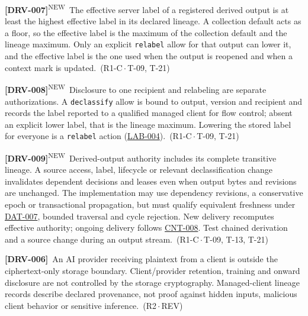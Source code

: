 \documentclass[11pt,a4paper]{article}
\newcommand{\code}[1]{{\small\nolinkurl{#1}}}
\newcommand{\rr}[1]{\hyperlink{req:#1}{#1}}
\newcommand{\reqtag}[2]{{\footnotesize\color{accent}(#1\,$\cdot$\,#2)}}
\newcommand{\req}[4]{\par\noindent\hypertarget{req:#1}{\textbf{[#1]}}\ #4\ \reqtag{#2}{#3}\par}
\newcommand{\reqn}[4]{\par\noindent\hypertarget{req:#1}{\textbf{[#1]}}\textsuperscript{\color{accent}\tiny NEW}\ #4\ \reqtag{#2}{#3}\par}
\begin{document}
\reqn{DRV-007}{R1-C}{T-09, T-21}{The effective server label of a registered derived output is at least the highest effective label in its declared lineage. A collection default acts as a floor, so the effective label is the maximum of the collection default and the lineage maximum. Only an explicit \code{relabel} allow for that output can lower it, and the effective label is the one used when the output is reopened and when a context mark is updated.}
\reqn{DRV-008}{R1-C}{T-09, T-21}{Disclosure to one recipient and relabeling are separate authorizations. A \code{declassify} allow is bound to output, version and recipient and records the label reported to a qualified managed client for flow control; absent an explicit lower label, that is the lineage maximum. Lowering the stored label for everyone is a \code{relabel} action (\rr{LAB-004}).}
\reqn{DRV-009}{R1-C}{T-09, T-13, T-21}{Derived-output authority includes its complete transitive lineage. A source access, label, lifecycle or relevant declassification change invalidates dependent decisions and leases even when output bytes and revisions are unchanged. The implementation may use dependency revisions, a conservative epoch or transactional propagation, but must qualify equivalent freshness under \rr{DAT-007}, bounded traversal and cycle rejection. New delivery recomputes effective authority; ongoing delivery follows \rr{CNT-008}. Test chained derivation and a source change during an output stream.}
\req{DRV-006}{R2}{REV}{An AI provider receiving plaintext from a client is outside the ciphertext-only storage boundary. Client/provider retention, training and onward disclosure are not controlled by the storage cryptography. Managed-client lineage records describe declared provenance, not proof against hidden inputs, malicious client behavior or sensitive inference.}
\end{document}
